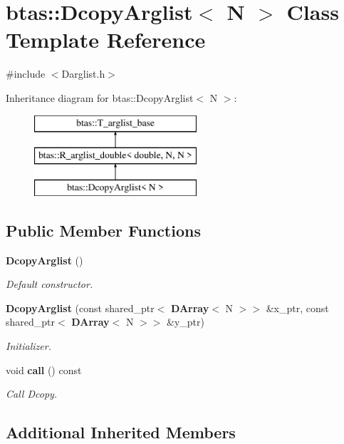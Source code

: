 \section{btas\-:\-:Dcopy\-Arglist$<$ N $>$ Class Template Reference}
\label{d9/dfc/classbtas_1_1DcopyArglist}


{\ttfamily \#include $<$Darglist.\-h$>$}

Inheritance diagram for btas\-:\-:Dcopy\-Arglist$<$ N $>$\-:\begin{figure}[H]
\begin{center}
\leavevmode
\includegraphics[height=3.000000cm]{d9/dfc/classbtas_1_1DcopyArglist}
\end{center}
\end{figure}
\subsection*{Public Member Functions}
\begin{DoxyCompactItemize}
\item 
{\bf Dcopy\-Arglist} ()
\begin{DoxyCompactList}\small\item\em Default constructor. \end{DoxyCompactList}\item 
{\bf Dcopy\-Arglist} (const shared\-\_\-ptr$<$ {\bf D\-Array}$<$ N $>$$>$ \&x\-\_\-ptr, const shared\-\_\-ptr$<$ {\bf D\-Array}$<$ N $>$$>$ \&y\-\_\-ptr)
\begin{DoxyCompactList}\small\item\em Initializer. \end{DoxyCompactList}\item 
void {\bf call} () const 
\begin{DoxyCompactList}\small\item\em Call Dcopy. \end{DoxyCompactList}\end{DoxyCompactItemize}
\subsection*{Additional Inherited Members}


